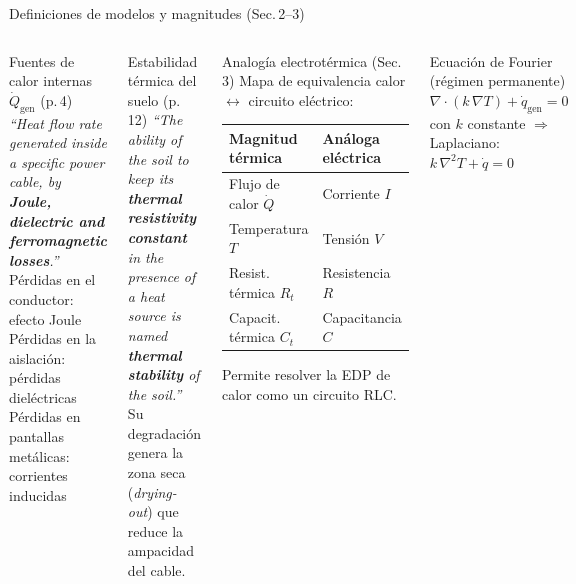 \documentclass[aspectratio=169]{beamer}
\begin{document}
\begin{frame}[shrink=7]{Definiciones de modelos y magnitudes (Sec.\,2--3)}
  \begin{columns}[T]
      \begin{block}{Fuentes de calor internas $\dot{Q}_\text{gen}$ (p.\,4)}
        \footnotesize
        \textit{``Heat flow rate generated inside a specific power cable,
        by \textbf{Joule, dielectric and ferromagnetic losses}.''}\\[0.1em]
        Pérdidas en el conductor: efecto Joule\\
        Pérdidas en la aislación: pérdidas dieléctricas\\
        Pérdidas en pantallas metálicas: corrientes inducidas
      \end{block}
      \vspace{0.1em}
      \begin{block}{Estabilidad térmica del suelo (p.\,12)}
        \footnotesize
        \textit{``The ability of the soil to keep its \textbf{thermal resistivity
        constant} in the presence of a heat source is named \textbf{thermal
        stability} of the soil.''}\\[0.1em]
        Su degradación genera la zona seca (\textit{drying-out}) que
        reduce la ampacidad del cable.
      \end{block}
      \begin{block}{Analogía electrotérmica (Sec.\,3)}
        \small
        Mapa de equivalencia calor $\leftrightarrow$ circuito eléctrico:
        \begin{center}\footnotesize
        \begin{tabular}{ll}
          \toprule
          \textbf{Magnitud térmica} & \textbf{Análoga eléctrica}\\
          \midrule
          Flujo de calor $\dot{Q}$ & Corriente $I$\\
          Temperatura $T$ & Tensión $V$\\
          Resist. térmica $R_t$ & Resistencia $R$\\
          Capacit. térmica $C_t$ & Capacitancia $C$\\
          \bottomrule
        \end{tabular}
        \end{center}
        Permite resolver la EDP de calor como un circuito RLC.
      \end{block}
      \begin{exampleblock}{Ecuación de Fourier (régimen permanente)}
        \small
        $\nabla \cdot (k\,\nabla T) + \dot{q}_\text{gen} = 0$\\[0.2em]
        con $k$ constante $\Rightarrow$ Laplaciano: $k\,\nabla^2 T + \dot{q} = 0$
      \end{exampleblock}
  \end{columns}
\end{frame}
\end{document}
